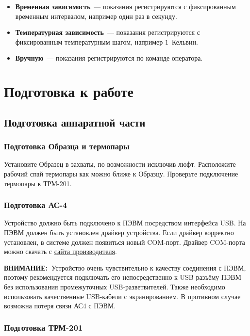 \documentclass[12pt, a4paper, twocolumn]{report}
\newcommand{\IMPORTANT}{{\bf ВНИМАНИЕ:~}}
\begin{document}
\begin{itemize}
\item {\bf Временная зависимость}~--- показания регистрируются с фиксированным временным интервалом, например один раз в секунду.
\item {\bf Температурная зависимость}~--- показания регистрируются с фиксированным температурным шагом, например $1$~Кельвин.
\item \label{sec_reg_type_manual} {\bf Вручную}~--- показания регистрируются по команде оператора.
\end{itemize}

\chapter{Подготовка к работе}

\section{Подготовка аппаратной части}

\subsection{Подготовка Образца и термопары}

Установите Образец в захваты, по возможности исключив люфт. Расположите рабочий спай термопары как можно ближе к Образцу. Проверьте подключение термопары к ТРМ-201.

\subsection{Подготовка АС-4}

Устройство должно быть подключено к ПЭВМ посредством интерфейса USB. На ПЭВМ должен быть установлен драйвер устройства. Если драйвер корректно установлен, в системе должен появиться новый COM-порт. Драйвер COM-порта можно скачать с \href{http://www.owen.ru/catalog/avtomaticheskij_preobrazovatel_interfejsov_usb_rs_485_owen_as4/opisanie}{сайта производителя}.

\IMPORTANT Устройство очень чувствительно к качеству соединения с ПЭВМ, поэтому рекомендуется подключать его непосредственно к USB разъёму ПЭВМ без использования промежуточных USB-разветвителей. Также необходимо использовать качественные USB-кабели с экранированием. В противном случае возможна потеря связи АС4 с ПЭВМ.

\subsection{Подготовка ТРМ-201}
\end{document}
